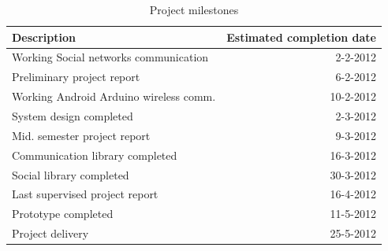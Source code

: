 \begin{table}[h!]
	\begin{tabular}{| l | r |}
		\hline

		\textbf{Description} & \textbf{Estimated completion date} \\
		\hline

		Working Social networks communication & 2-2-2012 \\
		\hline

		Preliminary project report & 6-2-2012 \\
		\hline

		Working Android Arduino wireless comm. & 10-2-2012 \\
		\hline

		System design completed & 2-3-2012 \\
		\hline

		Mid. semester project report & 9-3-2012 \\
		\hline

		Communication library completed & 16-3-2012 \\
		\hline

		Social library completed & 30-3-2012 \\
		\hline

		Last supervised project report & 16-4-2012 \\
		\hline

		Prototype completed & 11-5-2012 \\
		\hline

		Project delivery & 25-5-2012 \\
		\hline

	\end{tabular}
	\caption{Project milestones}
	\label{tbl:milestone}
\end{table}


\newpage

